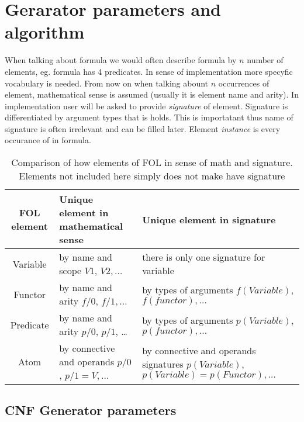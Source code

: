 \chapter{Gerarator parameters and algorithm}

When talking about formula we would often describe formula by $n$ number of elements, eg. formula has 4 predicates. In sense of implementation more specyfic vocabulary is needed. From now on when talking abount $n$ occurrences of element, mathematical sense is assumed (usually it is element name and arity). In implementation user will be asked to provide \textit{signature} of element. Signature is differentiated by argument types that is holds. This is importatant thus name of signature is often irrelevant and can be filled later. Element \textit{instance} is every occurance of in formula.

\begin{table}
  \centering
  \footnotesize
  \begin{tabularx}{\textwidth}{|c|X|X|}
    \hline
    FOL element & Unique element in mathematical sense & Unique element in signature \\
    \hline
    Variable & by name and scope $V1$, $V2, \dots$ & there is only one signature for variable \\  
    \hline
    Functor & by name and arity $f/0$, $f/1, \dots$ & by types of arguments $f(Variable)$, $f(functor), \dots$ \\
    \hline
    Predicate & by name and arity $p/0$, $p/1$, \dots & by types of arguments $p(Variable)$, $p(functor), \dots$ \\
    \hline
    Atom & by connective and operands $p/0$, $p/1 = V, \dots$ & by connective and operands signatures $p(Variable)$, $p(Variable) = p(Functor), \dots$ \\
    \hline
  \end{tabularx}
  \caption{Comparison of how elements of FOL in sense of math and signature. Elements not included here simply does not make have signature}
\end{table}

\section{CNF Generator parameters}


